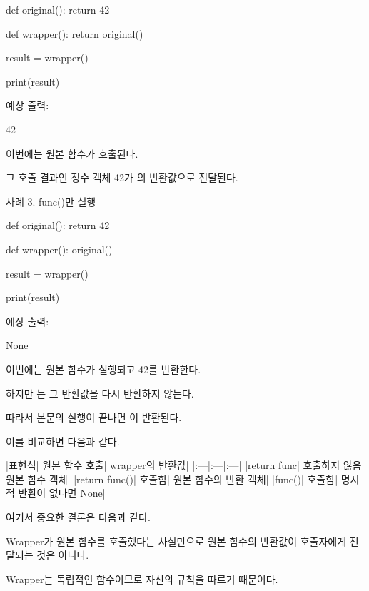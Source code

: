 \begin{dhkcode}
def original():
    return 42


def wrapper():
    return original()


result = wrapper()

print(result)
\end{dhkcode}

예상 출력:

\begin{dhkzsh}
42
\end{dhkzsh}

이번에는 원본 함수가 호출된다.

그 호출 결과인 정수 객체 42가 의 반환값으로 전달된다.

\begin{dhknote}
\begin{dhksmry}[centered]
사례 3. func()만 실행
\end{dhksmry}
\end{dhknote}

\begin{dhkcode}
def original():
    return 42


def wrapper():
    original()


result = wrapper()

print(result)
\end{dhkcode}

예상 출력:

\begin{dhkzsh}
None
\end{dhkzsh}

이번에는 원본 함수가 실행되고 42를 반환한다.

하지만 는 그 반환값을 다시 반환하지 않는다.

따라서 본문의 실행이 끝나면 이 반환된다.

이를 비교하면 다음과 같다.

\begin{dhktable}
|표현식|	원본 함수 호출|	wrapper의 반환값|
|:---|:---|:---|
|return func|	호출하지 않음|	원본 함수 객체|
|return func()|	호출함|	원본 함수의 반환 객체|
|func()|	호출함|	명시적 반환이 없다면 None|
\end{dhktable}

여기서 중요한 결론은 다음과 같다.

Wrapper가 원본 함수를 호출했다는 사실만으로 원본 함수의 반환값이 호출자에게 전달되는 것은 아니다.

Wrapper는 독립적인 함수이므로 자신의  규칙을 따르기 때문이다.

